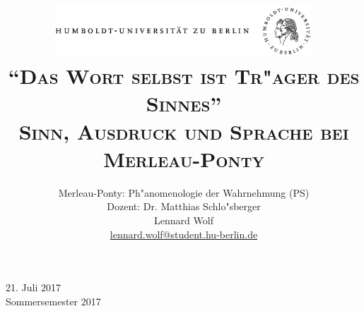 \documentclass[a4paper, 12pt]{article}
\date{\vspace{-3ex}}
\begin{document}
\title{\vspace{5ex}
	\includegraphics*[bb=0 0 720 200, width=0.72\textwidth]{ErstesSem/images/hu_logo.png}\\
	\vspace{30pt}
	\scshape\LARGE{"`Das Wort selbst ist Tr"ager des Sinnes"'}\\\Large{Sinn, Ausdruck und Sprache bei Merleau-Ponty}\\\vspace{20pt}}
	


\author{Merleau-Ponty: Ph"anomenologie der Wahrnehmung (PS)\\
	\vspace{6pt}
          Dozent: Dr. Matthias Schlo"sberger\\\vspace{4pt}Lennard Wolf\\
        \small{\href{mailto:lennard.wolf@student.hu-berlin.de}{lennard.wolf@student.hu-berlin.de}}}      

\maketitle

\vspace{\fill}

\begin{minipage}[]{0.92\textwidth}
    \centering
    \onehalfspacing
    \large   
    21. Juli 2017\\
    Sommersemester 2017

    \vspace{-20mm} 
\end{minipage}%
\thispagestyle{empty}
\newpage
\setcounter{page}{1}
\end{document}
